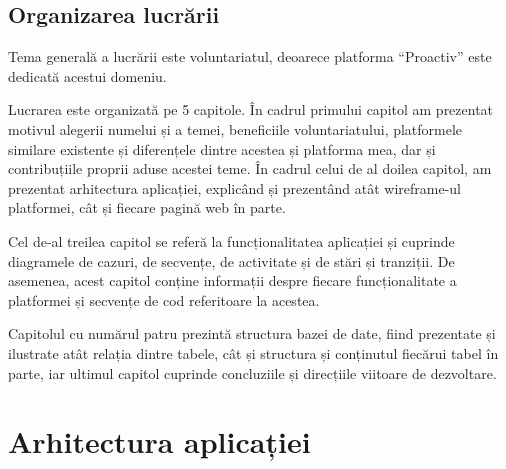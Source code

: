 \documentclass[12pt,a4paper]{report}
\begin{document}
\section{Organizarea lucrării}
\par
Tema generală a lucrării este voluntariatul, deoarece platforma “Proactiv” este dedicată acestui domeniu.
\\\par 
Lucrarea este organizată pe 5 capitole. În cadrul primului capitol am prezentat motivul alegerii numelui și a temei, beneficiile voluntariatului, platformele similare existente și diferențele dintre acestea și platforma mea, dar și contribuțiile proprii aduse acestei teme. În cadrul celui de al doilea capitol, am prezentat arhitectura aplicației, explicând și prezentând atât wireframe-ul platformei, cât și fiecare pagină web în parte.
\\\par 
Cel de-al treilea capitol se referă la funcționalitatea aplicației și cuprinde diagramele de cazuri, de secvențe, de activitate și de stări și tranziții. De asemenea, acest capitol conține informații despre fiecare funcționalitate a platformei și secvențe de cod referitoare la acestea.
\\\par 
Capitolul cu numărul patru prezintă structura bazei de date, fiind prezentate și ilustrate atât relația dintre tabele, cât și structura și conținutul fiecărui tabel în parte, iar ultimul capitol cuprinde concluziile și direcțiile viitoare de dezvoltare.


\chapter{Arhitectura aplicației}
\end{document}
